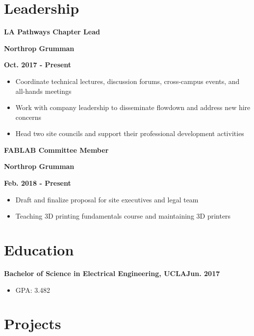\documentclass[12pt]{article}
\newcommand\textbox[1]{\parbox{.333\textwidth}{#1}}
\newcommand{\textlcr}[3]{\textbox{\textbf{#1}\hfill}\textbox{\hfil \textbf{#2}\hfil}\textbox{\hfill \textbf{#3}}}
\begin{document}
\section*{Leadership}
\vspace*{-1em}\makebox[\linewidth]{\rule{\textwidth}{0.4pt}}

\textlcr{LA Pathways Chapter Lead}{Northrop Grumman}{Oct. 2017 - Present}
\begin{itemize}
\item Coordinate technical lectures, discussion forums, cross-campus events, and all-hands meetings
\item Work with company leadership to disseminate flowdown and address new hire concerns
\item Head two site councils and support their professional development activities
\end{itemize}

\bigskip
\textlcr{FABLAB Committee Member}{Northrop Grumman}{Feb. 2018 - Present}
\begin{itemize}
\item Draft and finalize proposal for site executives and legal team
\item Teaching 3D printing fundamentals course and maintaining 3D printers
\end{itemize}

\section*{Education}
\vspace*{-1em}\makebox[\linewidth]{\rule{\textwidth}{0.4pt}}

\textbf{Bachelor of Science in Electrical Engineering, UCLA}\hfill\textbf{Jun. 2017}
\begin{itemize}
\item GPA: 3.482
\end{itemize}


\section*{Projects}
\vspace*{-1em}\makebox[\linewidth]{\rule{\textwidth}{0.4pt}}
\end{document}
